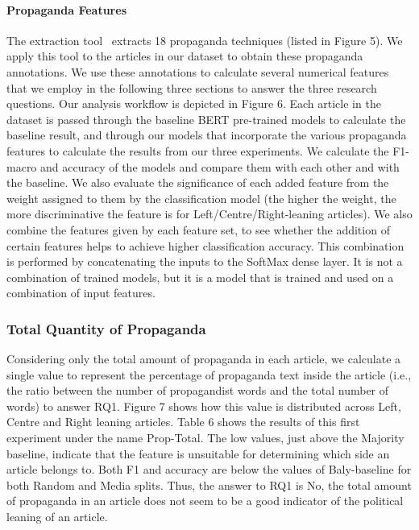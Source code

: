 \paragraph{Propaganda Features}
The extraction tool~\citep{da2019fine} extracts 18 propaganda techniques (listed in Figure 5). We apply this tool to the articles in our dataset to obtain these propaganda annotations. We use these annotations to calculate several numerical features that we employ in the following three sections to answer the three research questions.
Our analysis workflow is depicted in Figure 6. Each article in the dataset is passed through the baseline BERT pre-trained models to calculate the baseline result, and through our models that incorporate the various propaganda features to calculate the results from our three experiments.
We calculate the F1-macro and accuracy of the models and compare them with each other and with the baseline. We also evaluate the significance of each added feature from the weight assigned to them by the classification model (the higher the weight, the more discriminative the feature is for Left/Centre/Right-leaning articles). We also combine the features given by each feature set, to see whether the addition of certain features helps to achieve higher classification accuracy. This combination is performed by concatenating the inputs to the SoftMax dense layer. It is not a combination of trained models, but it is a model that is trained and used on a combination of input features.


\subsubsection{Total Quantity of Propaganda}
Considering only the total amount of propaganda in each article, we calculate a single value to represent the percentage of propaganda text inside the article (i.e., the ratio between the number of propagandist words and the total number of words) to answer RQ1.
Figure 7 shows how this value is distributed across Left, Centre and Right leaning articles. Table 6 shows the results of this first experiment under the name Prop-Total. The low values, just above the Majority baseline, indicate that the feature is unsuitable for determining which side an article belongs to. Both F1 and accuracy are below the values of Baly-baseline for both Random and Media splits. Thus, the answer to RQ1 is No, the total amount of propaganda in an article does not seem to be a good indicator of the political leaning of an article.

